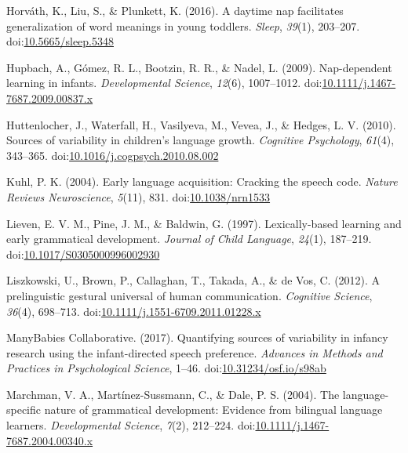 \documentclass[floatsintext,man]{apa6}
\theoremstyle{definition}
\theoremstyle{definition}
\theoremstyle{definition}
\theoremstyle{remark}
\begin{document}
\hypertarget{ref-horvath2016daytime}{}
Horváth, K., Liu, S., \& Plunkett, K. (2016). A daytime nap facilitates
generalization of word meanings in young toddlers. \emph{Sleep},
\emph{39}(1), 203--207.
doi:\href{https://doi.org/10.5665/sleep.5348}{10.5665/sleep.5348}

\hypertarget{ref-hupbach2009nap}{}
Hupbach, A., Gómez, R. L., Bootzin, R. R., \& Nadel, L. (2009).
Nap-dependent learning in infants. \emph{Developmental Science},
\emph{12}(6), 1007--1012.
doi:\href{https://doi.org/10.1111/j.1467-7687.2009.00837.x}{10.1111/j.1467-7687.2009.00837.x}

\hypertarget{ref-huttenlocher2010sources}{}
Huttenlocher, J., Waterfall, H., Vasilyeva, M., Vevea, J., \& Hedges, L.
V. (2010). Sources of variability in children's language growth.
\emph{Cognitive Psychology}, \emph{61}(4), 343--365.
doi:\href{https://doi.org/10.1016/j.cogpsych.2010.08.002}{10.1016/j.cogpsych.2010.08.002}

\hypertarget{ref-kuhl2004early}{}
Kuhl, P. K. (2004). Early language acquisition: Cracking the speech
code. \emph{Nature Reviews Neuroscience}, \emph{5}(11), 831.
doi:\href{https://doi.org/10.1038/nrn1533}{10.1038/nrn1533}

\hypertarget{ref-lieven1997lexically}{}
Lieven, E. V. M., Pine, J. M., \& Baldwin, G. (1997). Lexically-based
learning and early grammatical development. \emph{Journal of Child
Language}, \emph{24}(1), 187--219.
doi:\href{https://doi.org/10.1017/S0305000996002930}{10.1017/S0305000996002930}

\hypertarget{ref-liszkowski2012prelinguistic}{}
Liszkowski, U., Brown, P., Callaghan, T., Takada, A., \& de Vos, C.
(2012). A prelinguistic gestural universal of human communication.
\emph{Cognitive Science}, \emph{36}(4), 698--713.
doi:\href{https://doi.org/10.1111/j.1551-6709.2011.01228.x}{10.1111/j.1551-6709.2011.01228.x}

\hypertarget{ref-manybabies2017}{}
ManyBabies Collaborative. (2017). Quantifying sources of variability in
infancy research using the infant-directed speech preference.
\emph{Advances in Methods and Practices in Psychological Science},
1--46.
doi:\href{https://doi.org/10.31234/osf.io/s98ab}{10.31234/osf.io/s98ab}

\hypertarget{ref-marchman2004language}{}
Marchman, V. A., Martínez-Sussmann, C., \& Dale, P. S. (2004). The
language-specific nature of grammatical development: Evidence from
bilingual language learners. \emph{Developmental Science}, \emph{7}(2),
212--224.
doi:\href{https://doi.org/10.1111/j.1467-7687.2004.00340.x}{10.1111/j.1467-7687.2004.00340.x}
\end{document}
